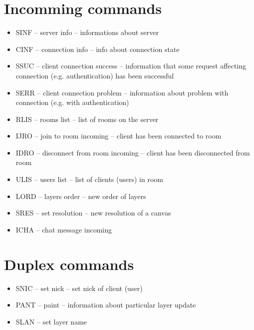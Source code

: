 \section{Incomming commands}

\begin{itemize}
    \item SINF -- server info -- informations about server
    \item CINF -- connection info -- info about connection state
    \item SSUC -- client connection success -- information that some request affecting connection (e.g. authentication) has been successful
    \item SERR -- client connection problem -- information about problem with connection (e.g. with authentication)
    \item RLIS -- rooms list -- list of rooms on the server
    \item IJRO -- join to room incoming -- client has been connected to room
    \item IDRO -- disconnect from room incoming -- client has been disconnected from room
    \item ULIS -- users list -- list of clients (users) in room
	\item LORD -- layers order -- new order of layers
	\item SRES -- set resolution -- new resolution of a canvas
	\item ICHA -- chat message incoming 
\end{itemize}

\section{Duplex commands}

\begin{itemize}
    \item SNIC -- set nick -- set nick of client (user)
	\item PANT -- paint -- information about particular layer update
	\item SLAN -- set layer name
\end{itemize}




%


